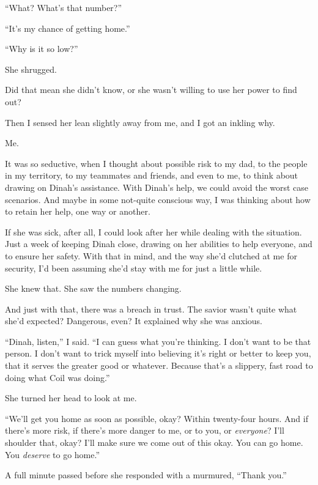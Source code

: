 ``What?  What's that number?''



``It's my chance of getting home.''



``Why is it so low?''



She shrugged.



Did that mean she didn't know, or she wasn't willing to use her power to find out?



Then I sensed her lean slightly away from me, and I got an inkling why.



Me.



It was so seductive, when I thought about possible risk to my dad, to the people in my territory, to my teammates and friends, and even to me, to think about drawing on Dinah's assistance.  With Dinah's help, we could avoid the worst case scenarios.  And maybe in some not-quite conscious way, I was thinking about how to retain her help, one way or another.



If she was sick, after all, I could look after her while dealing with the situation.  Just a week of keeping Dinah close, drawing on her abilities to help everyone, and to ensure her safety.  With that in mind, and the way she'd clutched at me for security, I'd been assuming she'd stay with me for just a little while.



She knew that.  She saw the numbers changing.



And just with that, there was a breach in trust.  The savior wasn't quite what she'd expected?  Dangerous, even?  It explained why she was anxious.



``Dinah, listen,'' I said.  ``I can guess what you're thinking.  I don't want to be that person.  I don't want to trick myself into believing it's right or better to keep you, that it serves the greater good or whatever.  Because that's a slippery, fast road to doing what Coil was doing.''



She turned her head to look at me.



``We'll get you home as soon as possible, okay?  Within twenty-four hours.  And if there's more risk, if there's more danger to me, or to you, or \emph{everyone}?  I'll shoulder that, okay?  I'll make sure we come out of this okay.  You can go home.  You \emph{deserve} to go home.''



A full minute passed before she responded with a murmured, ``Thank you.''





